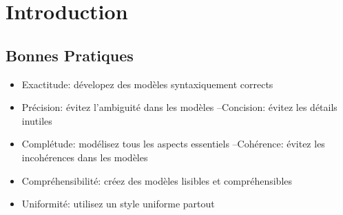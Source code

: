 \chapter{Introduction}\label{chap:introduction}
\section{Bonnes Pratiques}

\begin{itemize}
    \item Exactitude: dévelopez des modèles syntaxiquement corrects
    \item Précision: évitez l’ambiguité dans les modèles –Concision: évitez les détails inutiles
    \item Complétude: modélisez tous les aspects essentiels –Cohérence: évitez les incohérences dans les modèles
    \item Compréhensibilité: créez des modèles lisibles et compréhensibles
    \item Uniformité: utilisez un style uniforme partout
\end{itemize}
